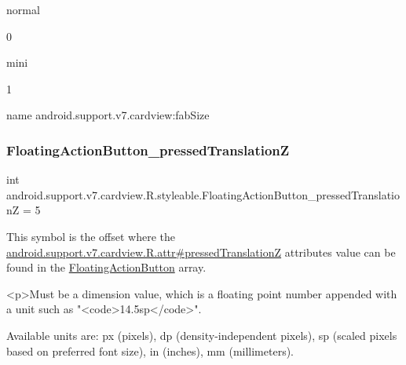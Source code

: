{\ttfamily normal}

0

{\ttfamily mini}

1

name android.\+support.\+v7.\+cardview\+:fab\+Size \mbox{\label{classandroid_1_1support_1_1v7_1_1cardview_1_1R_1_1styleable_a8529a0b7a3336b9f9172273795f573f5}} 
\subsubsection{\texorpdfstring{Floating\+Action\+Button\+\_\+pressed\+TranslationZ}{FloatingActionButton\_pressedTranslationZ}}
{\footnotesize\ttfamily int android.\+support.\+v7.\+cardview.\+R.\+styleable.\+Floating\+Action\+Button\+\_\+pressed\+TranslationZ = 5\hspace{0.3cm}{\ttfamily [static]}}

This symbol is the offset where the \hyperlink{classandroid_1_1support_1_1v7_1_1cardview_1_1R_1_1attr_af68484ea774a4ae05b7ada0004f66513}{android.\+support.\+v7.\+cardview.\+R.\+attr\#pressed\+TranslationZ} attribute\textquotesingle{}s value can be found in the \hyperlink{classandroid_1_1support_1_1v7_1_1cardview_1_1R_1_1styleable_a1be8c9bcabd399162362befcccf73f59}{Floating\+Action\+Button} array.

\begin{DoxyVerb}      <p>Must be a dimension value, which is a floating point number appended with a unit such as "<code>14.5sp</code>".
\end{DoxyVerb}
 Available units are\+: px (pixels), dp (density-\/independent pixels), sp (scaled pixels based on preferred font size), in (inches), mm (millimeters). 

